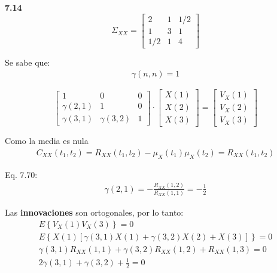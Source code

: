 \textbf{7.14}
\begin{equation*}
\Sigma_{XX} = 
	\begin{bmatrix}
		2 & 1 & 1/2 \\
		1 & 3 & 1 \\
		1/2 & 1 & 4 
	\end{bmatrix}
\end{equation*}

Se sabe que:
\begin{equation*}
\begin{gathered}
	\gamma (n,n) = 1
\end{gathered}
\end{equation*}

\begin{equation*}
	\begin{bmatrix}
		1 & 0 & 0 \\
		\gamma(2,1) & 1 & 0 \\
		\gamma(3,1) & \gamma(3,2) & 1
	\end{bmatrix}
	\cdot
	\begin{bmatrix}
		X(1) \\
		X(2) \\
		X(3) 
	\end{bmatrix}
	=
	\begin{bmatrix}
		V_X(1) \\
		V_X(2) \\
		V_X(3) 
	\end{bmatrix}
\end{equation*}	

Como la media es nula
\begin{equation*}
\begin{gathered}
	C_{XX}(t_1, t_2) = R_{XX}(t_1, t_2) - \mu_{X}(t_1) \mu_{X}(t_2) = R_{XX}(t_1, t_2)
\end{gathered}
\end{equation*}

Eq. 7.70:
\begin{equation*}
\begin{gathered}
	\gamma (2,1) = -\frac{R_{XX}(1,2)}{R_{XX}(1,1)} = -\frac{1}{2}
\end{gathered}
\end{equation*}

Las \textbf{innovaciones} son ortogonales, por lo tanto:
\begin{equation*}
\begin{gathered}
	E\left\lbrace V_X(1) V_X(3) \right\rbrace = 0 \\
	E\left\lbrace X(1) \left[ \gamma(3,1)X(1) + \gamma(3,2)X(2) + X(3)\right] \right\rbrace = 0 \\	
	\gamma(3,1)R_{XX}(1,1) + \gamma(3,2)R_{XX}(1,2) + R_{XX}(1,3) = 0	\\
	2\gamma(3,1) + \gamma(3,2) + \frac{1}{2} = 0
\end{gathered}
\end{equation*}


